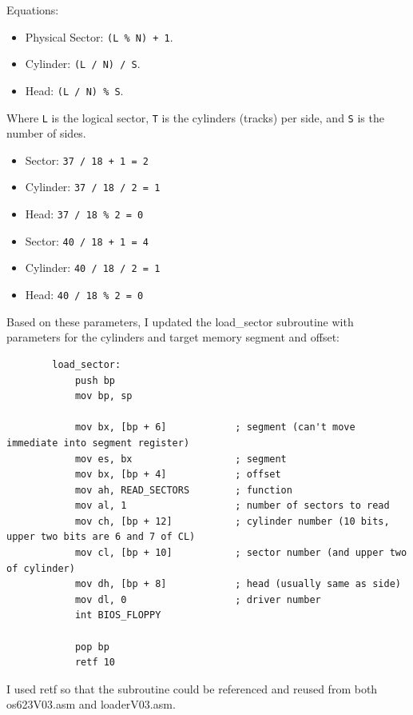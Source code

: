 \documentclass{article}
\begin{document}
    Equations:
    \begin{itemize}
        \item Physical Sector: \verb|(L % N) + 1|.
        \item Cylinder: \verb|(L / N) / S|.
        \item Head: \verb|(L / N) % S|.
    \end{itemize}
    Where \verb|L| is the logical sector, \verb|T| is the cylinders (tracks) per side, and \verb|S| is the number of sides.

    \begin{itemize}
        \item Sector: \verb|37 / 18 + 1 = 2|
        \item Cylinder: \verb|37 / 18 / 2 = 1|
        \item Head: \verb|37 / 18 % 2 = 0|
    \end{itemize}

    \begin{itemize}
        \item Sector: \verb|40 / 18 + 1 = 4|
        \item Cylinder: \verb|40 / 18 / 2 = 1|
        \item Head: \verb|40 / 18 % 2 = 0|
    \end{itemize}

    Based on these parameters, I updated the load\_sector subroutine with parameters for the cylinders and target memory segment and offset:
    \begin{lstlisting}
        load_sector:
            push bp
            mov bp, sp

            mov bx, [bp + 6]            ; segment (can't move immediate into segment register)
            mov es, bx                  ; segment
            mov bx, [bp + 4]            ; offset
            mov ah, READ_SECTORS        ; function
            mov al, 1                   ; number of sectors to read
            mov ch, [bp + 12]           ; cylinder number (10 bits, upper two bits are 6 and 7 of CL)
            mov cl, [bp + 10]           ; sector number (and upper two of cylinder)
            mov dh, [bp + 8]            ; head (usually same as side)
            mov dl, 0                   ; driver number
            int BIOS_FLOPPY

            pop bp
            retf 10
    \end{lstlisting}

    I used retf so that the subroutine could be referenced and reused from both os623V03.asm and loaderV03.asm.
\end{document}
